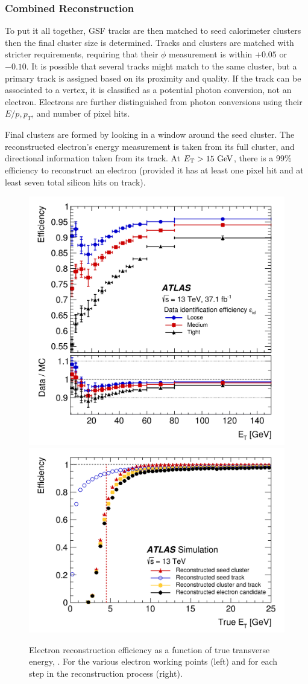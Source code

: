 \subsubsection{Combined Reconstruction}
To put it all together, \ac{GSF} tracks are then matched to seed calorimeter clusters then the final cluster size is determined. Tracks and clusters are matched with stricter requirements, requiring that their $\phi$ measurement is within $+0.05$ or $-0.10$. It is possible that several tracks might match to the same cluster, but a primary track is assigned based on its proximity and quality. If the track can be associated to a vertex, it is classified as a potential photon conversion, not an electron. Electrons are further distinguished from photon conversions using their $E/p, p_{T}$, and number of pixel hits. 

Final clusters are formed by looking in a window around the seed cluster. The reconstructed electron's energy measurement is taken from its full cluster, and directional information taken from its track. At $\et > 15 \GeV$, there is a 99\% efficiency to reconstruct an electron (provided it has at least one pixel hit and at least seven total silicon hits on track). 

\begin{figure}[htbp]
\centering
\includegraphics[width=.4\textwidth]{figures/EventReconstruction/elec-reco.png}
\includegraphics[width=.5\textwidth]{figures/EventReconstruction/elec-reco-steps.png}
\caption{Electron reconstruction efficiency as a function of true transverse energy, \et. For the various electron working points (left) and for each step in the reconstruction process (right).}
\label{fig:elec_gsf}
\end{figure}

